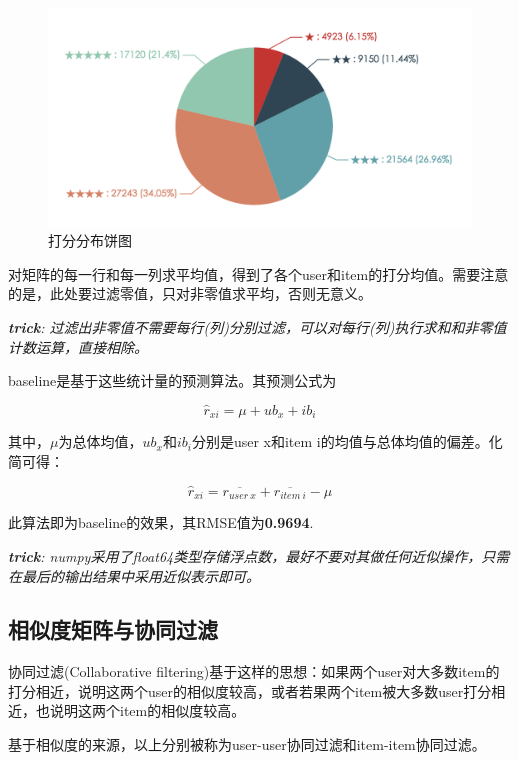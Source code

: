 \documentclass[utf8, a4paper, 11pt, onecolumn]{ctexart}
\begin{document}
\begin{spacing}{1.3}
\begin{figure}
	\centering
	\includegraphics[width=1.0\linewidth]{rating-pie.png}
	\caption{打分分布饼图}
	\label{rating-pie}
\end{figure}

对矩阵的每一行和每一列求平均值，得到了各个user和item的打分均值。需要注意的是，此处要过滤零值，只对非零值求平均，否则无意义。

\textit{\textbf{trick}: 过滤出非零值不需要每行(列)分别过滤，可以对每行(列)执行求和和非零值计数运算，直接相除。}

baseline是基于这些统计量的预测算法。其预测公式为

\[\hat{r}_{xi} = \mu + ub_{x} + ib_{i}\]

其中，$\mu$为总体均值，$ub_{x}$和$ib_{i}$分别是user x和item i的均值与总体均值的偏差。化简可得：

\[\hat{r}_{xi} = \overline{r_{user\ x}}+ \overline{r_{item\ i}} - \mu\]

此算法即为baseline的效果，其RMSE值为\textbf{0.9694}.

\textit{\textbf{trick}: numpy采用了float64类型存储浮点数，最好不要对其做任何近似操作，只需在最后的输出结果中采用近似表示即可。}


\subsection{相似度矩阵与协同过滤}

协同过滤(Collaborative filtering)基于这样的思想：如果两个user对大多数item的打分相近，说明这两个user的相似度较高，或者若果两个item被大多数user打分相近，也说明这两个item的相似度较高。

基于相似度的来源，以上分别被称为user-user协同过滤和item-item协同过滤。


\end{spacing}
\end{document}
